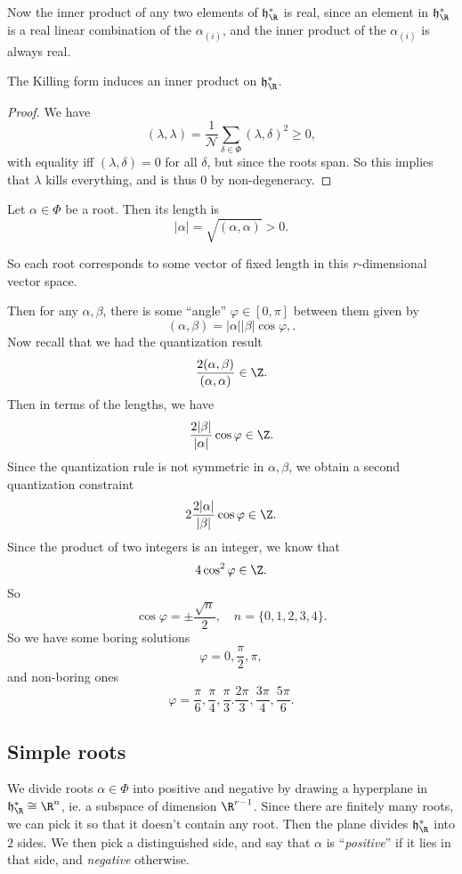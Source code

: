 \documentclass[a4paper]{article}
\begin{document}
Now the inner product of any two elements of $\mathfrak{h}_\R^*$ is real, since an element in $\mathfrak{h}_\R^*$ is a real linear combination of the $\alpha_{(i)}$, and the inner product of the $\alpha_{(i)}$ is always real.

\begin{prop}
  The Killing form induces an inner product on $\mathfrak{h}_\R^*$.
\end{prop}

\begin{proof}
  We have
  \[
    (\lambda, \lambda) = \frac{1}{\mathcal{N}} \sum_{\delta \in \Phi}(\lambda, \delta)^2 \geq 0,
  \]
  with equality iff $(\lambda, \delta) = 0$ for all $\delta$, but since the roots span. So this implies that $\lambda$ kills everything, and is thus $0$ by non-degeneracy.
\end{proof}

\begin{defi}
  Let $\alpha \in \Phi$ be a root. Then its length is
  \[
    |\alpha| = \sqrt{(\alpha, \alpha)} > 0.
  \]
\end{defi}
So each root corresponds to some vector of fixed length in this $r$-dimensional vector space.

Then for any $\alpha, \beta$, there is some ``angle'' $\varphi \in [0, \pi]$ between them given by
\[
  (\alpha, \beta) = |\alpha||\beta| \cos \varphi,.
\]
Now recall that we had the quantization result
\[
  \frac{2(\alpha, \beta)}{(\alpha, \alpha)} \in \Z.
\]
Then in terms of the lengths, we have
\[
  \frac{2 |\beta|}{|\alpha|} \cos \varphi \in \Z.
\]
Since the quantization rule is not symmetric in $\alpha, \beta$, we obtain a second quantization constraint
\[
  2\frac{2|\alpha|}{|\beta|} \cos \varphi \in \Z.
\]
Since the product of two integers is an integer, we know that
\[
  4 \cos^2 \varphi \in \Z.
\]
So
\[
  \cos \varphi = \pm \frac{\sqrt{n}}{2}, \quad n = \{0, 1, 2, 3, 4\}.
\]
So we have some boring solutions
\[
  \varphi = 0, \frac{\pi}{2}, \pi,
\]
and non-boring ones
\[
  \varphi = \frac{\pi}{6}, \frac{\pi}{4}, \frac{\pi}{3}. \frac{2\pi}{3}, \frac{3 \pi}{4}, \frac{5 \pi}{6}.
\]
\subsection{Simple roots}
We divide roots $\alpha \in \Phi$ into positive and negative by drawing a hyperplane in $\mathfrak{h}_\R^* \cong \R^n$, ie. a subspace of dimension $\R^{r - 1}$. Since there are finitely many roots, we can pick it so that it doesn't contain any root. Then the plane divides $\mathfrak{h}_\R^*$ into $2$ sides. We then pick a distinguished side, and say that $\alpha$ is ``\emph{positive}'' if it lies in that side, and \emph{negative} otherwise.
\end{document}
